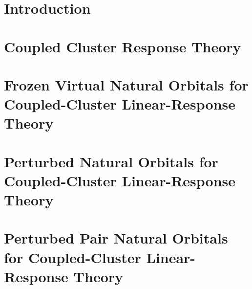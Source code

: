 \documentclass[12pt]{report}
\begin{document}
\tableofcontents
\pagebreak

\listoffigures
\pagebreak

\listoftables
\pagebreak

\pagestyle{myheadings}

\def\ket#1{| #1 \rangle}
\def\bra#1{\langle #1 |}
\def\bm#1{\mbox{\boldmath $#1$}}
\def\degrees{deg dm$^{-1}$ (g/mL)$^{-1}$}
\def\optrot{$[\alpha]$}
\def\crt#1{a_{#1}^{\dagger}}
\def\ann#1{a_{#1}^{\ }}
\def\cgs{($10^{-40}$ cgs)}


\chapter{Introduction}

\chapter{Coupled Cluster Response Theory}

\chapter{Frozen Virtual Natural Orbitals for Coupled-Cluster Linear-Response Theory}

\chapter{Perturbed Natural Orbitals for Coupled-Cluster Linear-Response Theory}

\chapter{Perturbed Pair Natural Orbitals for Coupled-Cluster Linear-Response Theory}

\end{document}
